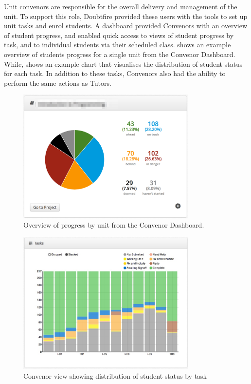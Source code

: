 Unit convenors are responsible for the overall delivery and management of the unit. To support this role, Doubtfire provided these users with the tools to set up unit tasks and enrol students. A dashboard provided Convenors with an overview of student progress, and enabled quick access to views of student progress by task, and to individual students via their scheduled class.  shows an example overview of students progress for a single unit from the Convenor Dashboard. While,  shows an example chart that visualises the distribution of student status for each task. In addition to these tasks, Convenors also had the ability to perform the same actions as Tutors.

\begin{figure}[thbp]
  \centering
  \includegraphics[width=0.8\textwidth]{Dashboard}%
  \caption{Overview of progress by unit from the Convenor Dashboard.}%
  \label{fig:dashboard}%
\end{figure}

\begin{figure}[thbp]
  \centering
  \includegraphics[width=0.8\textwidth]{TaskChart}%
  \caption{Convenor view showing distribution of student status by task}%
  \label{fig:task_chart_view}%
\end{figure}

